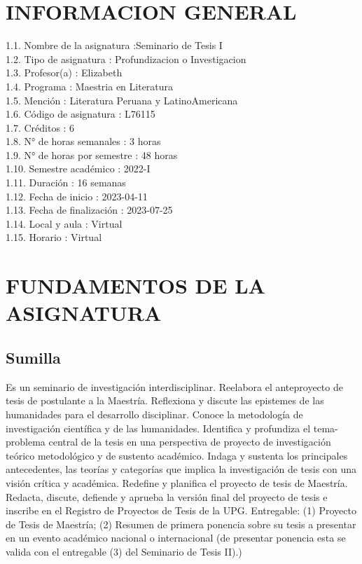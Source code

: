 \documentclass[a4paper]{article}
\begin{document}
\section{INFORMACION GENERAL}
1.1. Nombre de la asignatura :Seminario de Tesis I \\ 
1.2. Tipo de asignatura : Profundizacion o Investigacion \\ 
1.3. Profesor(a) : Elizabeth  \\ 
1.4. Programa : Maestria en Literatura \\ 
1.5. Mención : Literatura Peruana y LatinoAmericana \\ 
1.6. Código de asignatura : L76115 \\ 
1.7. Créditos : 6  \\ 
1.8. N° de horas semanales : 3 horas \\ 
1.9. N° de horas por semestre : 48 horas \\ 
1.10. Semestre académico : 2022-I \\ 
1.11. Duración : 16 semanas \\ 
1.12. Fecha de inicio : 2023-04-11 \\ 
1.13. Fecha de finalización : 2023-07-25 \\ 
1.14. Local y aula : Virtual \\ 
1.15. Horario : Virtual \\ 
\section{FUNDAMENTOS DE LA ASIGNATURA}
\subsection{Sumilla}
Es un seminario de investigación interdisciplinar. Reelabora el anteproyecto de tesis de
postulante a la Maestría. Reflexiona y discute las epistemes de las humanidades para el
desarrollo disciplinar. Conoce la metodología de investigación científica y de las humanidades.
Identifica y profundiza el tema-problema central de la tesis en una perspectiva de proyecto de
investigación teórico metodológico y de sustento académico. Indaga y sustenta los principales
antecedentes, las teorías y categorías que implica la investigación de tesis con una visión crítica
y académica. Redefine y planifica el proyecto de tesis de Maestría. Redacta, discute, defiende y
aprueba la versión final del proyecto de tesis e inscribe en el Registro de Proyectos de Tesis de la
UPG. Entregable: (1) Proyecto de Tesis de Maestría; (2) Resumen de primera ponencia sobre su
tesis a presentar en un evento académico nacional o internacional (de presentar ponencia esta
se valida con el entregable (3) del Seminario de Tesis II).)
\end{document}
